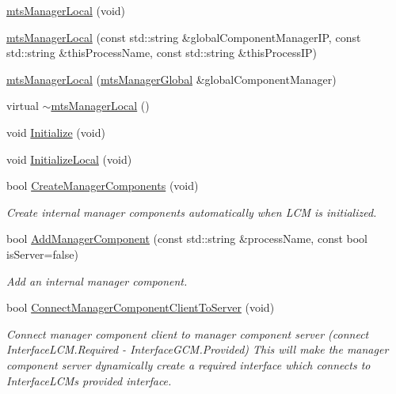 \begin{DoxyCompactItemize}
\item 
\hyperlink{classmts_manager_local_ae66b56b5f888842932ddd12d17adc8bb}{mts\+Manager\+Local} (void)
\item 
\hyperlink{classmts_manager_local_ac5a8372120fa1f883e5211f580b34536}{mts\+Manager\+Local} (const std\+::string \&global\+Component\+Manager\+I\+P, const std\+::string \&this\+Process\+Name, const std\+::string \&this\+Process\+I\+P)
\item 
\hyperlink{classmts_manager_local_a430160ea25a0dcc74c0208c4a872f8e6}{mts\+Manager\+Local} (\hyperlink{classmts_manager_global}{mts\+Manager\+Global} \&global\+Component\+Manager)
\item 
virtual \hyperlink{classmts_manager_local_a6f8d41b93110fd568984e64a2986d670}{$\sim$mts\+Manager\+Local} ()
\item 
void \hyperlink{classmts_manager_local_af5a33b217d47019766d3e2f0829c46bf}{Initialize} (void)
\item 
void \hyperlink{classmts_manager_local_a4f53f4cb51556279f988779e68279444}{Initialize\+Local} (void)
\item 
bool \hyperlink{classmts_manager_local_a618393b6dc9bf576d61ff846bc19cb8c}{Create\+Manager\+Components} (void)
\begin{DoxyCompactList}\small\item\em Create internal manager components automatically when L\+C\+M is initialized. \end{DoxyCompactList}\item 
bool \hyperlink{classmts_manager_local_a7919800d7447c0a66251e9efb6e7df52}{Add\+Manager\+Component} (const std\+::string \&process\+Name, const bool is\+Server=false)
\begin{DoxyCompactList}\small\item\em Add an internal manager component. \end{DoxyCompactList}\item 
bool \hyperlink{classmts_manager_local_a9a93bee9a7ba00ef62eb41636a55685d}{Connect\+Manager\+Component\+Client\+To\+Server} (void)
\begin{DoxyCompactList}\small\item\em Connect manager component client to manager component server (connect Interface\+L\+C\+M.\+Required -\/ Interface\+G\+C\+M.\+Provided) This will make the manager component server dynamically create a required interface which connects to Interface\+L\+C\+M\textquotesingle{}s provided interface. \end{DoxyCompactList}\item 

\end{DoxyCompactItemize}
